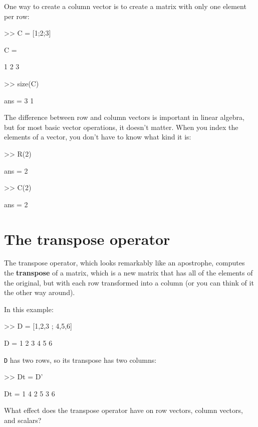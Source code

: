One way to create a column vector is to create a matrix with only
one element per row:

\begin{code}
>> C = [1;2;3]

C =

     1
     2
     3

>> size(C)

ans = 3     1
\end{code}

The difference between row and column vectors is important in
linear algebra, but for most basic vector operations, it doesn't matter.  When you index the elements of a vector, you don't have to know what kind
it is:


\begin{code}
>> R(2)

ans = 2

>> C(2)

ans = 2
\end{code}



\section{The transpose operator}

The transpose operator, which looks remarkably like an apostrophe,
computes the {\bf transpose} of a matrix, which is a new matrix
that has all of the elements of the original, but with each row
transformed into a column (or you can think of it the other way around).


In this example:

\begin{code}
>> D = [1,2,3 ; 4,5,6]

D =  1     2     3
     4     5     6
\end{code}

{\tt D} has two rows, so its transpose has two columns:

\begin{code}
>> Dt = D'

Dt = 1     4
     2     5
     3     6
\end{code}

\begin{ex}
What effect does the transpose operator
have on row vectors, column vectors, and scalars?
\end{ex}


